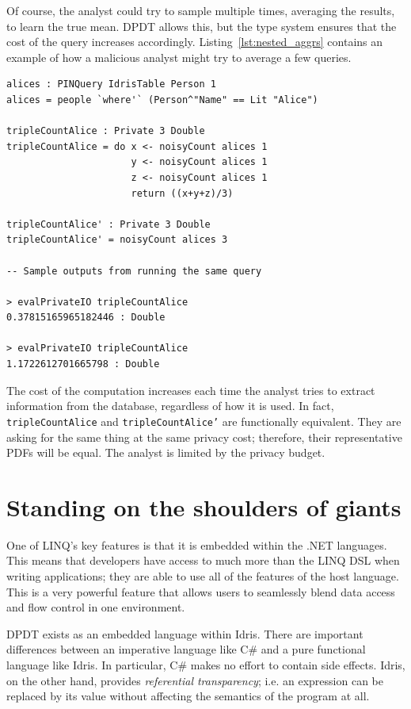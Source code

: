 \documentclass[12pt]{report}
\begin{document}
Of course, the analyst could try to sample multiple times, averaging the results, to learn the true mean.
DPDT allows this, but the type system ensures that the cost of the query increases accordingly.
Listing~\ref{lst:nested_aggrs} contains an example of how a malicious analyst might try to average a few queries.

\begin{lstlisting}[caption={Counting Alices (revisited)},label={lst:nested_aggrs}]
alices : PINQuery IdrisTable Person 1
alices = people `where'` (Person^"Name" == Lit "Alice")

tripleCountAlice : Private 3 Double
tripleCountAlice = do x <- noisyCount alices 1
                      y <- noisyCount alices 1
                      z <- noisyCount alices 1
                      return ((x+y+z)/3)

tripleCountAlice' : Private 3 Double
tripleCountAlice' = noisyCount alices 3

-- Sample outputs from running the same query

> evalPrivateIO tripleCountAlice
0.37815165965182446 : Double

> evalPrivateIO tripleCountAlice
1.1722612701665798 : Double
\end{lstlisting}

The cost of the computation increases each time the analyst tries to extract information from the database, regardless of how it is used.
In fact, \texttt{tripleCountAlice} and \texttt{tripleCountAlice'} are functionally equivalent.
They are asking for the same thing at the same privacy cost; therefore, their representative PDFs will be equal.
The analyst is limited by the privacy budget.

\section{Standing on the shoulders of giants}

One of LINQ's key features is that it is embedded within the .NET languages.
This means that developers have access to much more than the LINQ DSL when writing applications; they are able to use all of the features of the host language.
This is a very powerful feature that allows users to seamlessly blend data access and flow control in one environment.

DPDT exists as an embedded language within Idris.
There are important differences between an imperative language like C\# and a pure functional language like Idris.
In particular, C\# makes no effort to contain side effects.
Idris, on the other hand, provides \textit{referential transparency}; i.e. an expression can be replaced by its value without affecting the semantics of the program at all.
\end{document}
